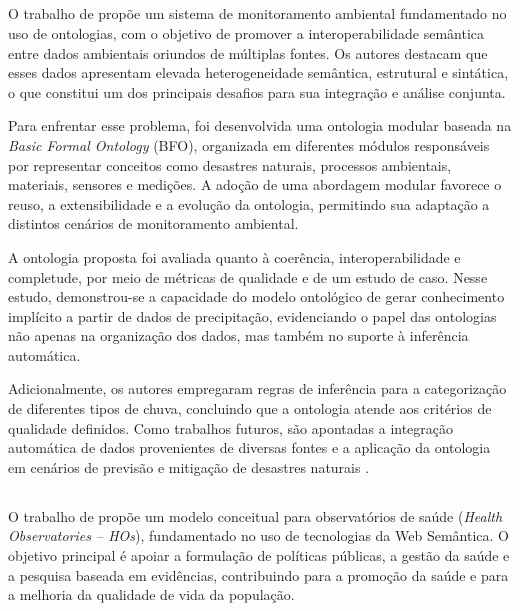 \subsection{\texorpdfstring{\citeauthor{masmoudi2018ontology}}{Masmoudi}}
O trabalho de \citeauthor{masmoudi2018ontology} propõe um sistema de monitoramento ambiental fundamentado no uso de ontologias, com o objetivo de promover a interoperabilidade semântica entre dados ambientais oriundos de múltiplas fontes. Os autores destacam que esses dados apresentam elevada heterogeneidade semântica, estrutural e sintática, o que constitui um dos principais desafios para sua integração e análise conjunta.

Para enfrentar esse problema, foi desenvolvida uma ontologia modular baseada na \textit{Basic Formal Ontology} (BFO), organizada em diferentes módulos responsáveis por representar conceitos como desastres naturais, processos ambientais, materiais, sensores e medições. A adoção de uma abordagem modular favorece o reuso, a extensibilidade e a evolução da ontologia, permitindo sua adaptação a distintos cenários de monitoramento ambiental.

A ontologia proposta foi avaliada quanto à coerência, interoperabilidade e completude, por meio de métricas de qualidade e de um estudo de caso. Nesse estudo, demonstrou-se a capacidade do modelo ontológico de gerar conhecimento implícito a partir de dados de precipitação, evidenciando o papel das ontologias não apenas na organização dos dados, mas também no suporte à inferência automática.

Adicionalmente, os autores empregaram regras de inferência para a categorização de diferentes tipos de chuva, concluindo que a ontologia atende aos critérios de qualidade definidos. Como trabalhos futuros, são apontadas a integração automática de dados provenientes de diversas fontes e a aplicação da ontologia em cenários de previsão e mitigação de desastres naturais \cite{masmoudi2018ontology}.

\subsection{\texorpdfstring{\citeauthor{yoshiura2018towards}}{Yoshiura}}
O trabalho de \citeauthor{yoshiura2018towards} propõe um modelo conceitual para observatórios de saúde (\textit{Health Observatories – HOs}), fundamentado no uso de tecnologias da Web Semântica. O objetivo principal é apoiar a formulação de políticas públicas, a gestão da saúde e a pesquisa baseada em evidências, contribuindo para a promoção da saúde e para a melhoria da qualidade de vida da população.

